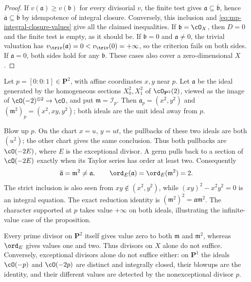 \begin{proof}
If $v(\mathfrak a)\geq v(\mathfrak b)$ for every divisorial $v$,
the finite test gives $\mathfrak a\subseteq\overline{\mathfrak b}$,
hence $\overline{\mathfrak a}\subseteq\overline{\mathfrak b}$ by
idempotence of integral closure. Conversely, this inclusion and
\eqref{eq:mp-integral-closure-values} give all the claimed
inequalities. If $\mathfrak b=\cO_X$, then $D=0$ and the finite
test is empty, as it should be. If $\mathfrak b=0$ and
$\mathfrak a\ne0$, the trivial valuation has
$v_{\triv}(\mathfrak a)=0<v_{\triv}(0)=+\infty$, so the criterion
fails on both sides. If $\mathfrak a=0$, both sides hold for any
$\mathfrak b$. These cases also cover a zero-dimensional $X$.
\end{proof}

\begin{example}\label{ex:mp-integral-closure-divisor-tests}
Let $p=[0:0:1]\in\mathbf P^2$, with affine coordinates $x,y$ near
$p$. Let $\mathfrak a$ be the ideal generated by the homogeneous
sections $X_0^2,X_1^2$ of $\cO_{\mathbf P^2}(2)$, viewed as the
image of $\cO(-2)^{\oplus2}\to\cO$, and put
$\mathfrak m=\mathcal I_p$. Then
$\mathfrak a_p=(x^2,y^2)$ and
$(\mathfrak m^2)_p=(x^2,xy,y^2)$; both ideals are the unit ideal
away from $p$.

Blow up $p$. On the chart $x=u$, $y=ut$, the pullbacks of these
two ideals are both $(u^2)$; the other chart gives the same
conclusion. Thus both pullbacks are $\cO(-2E)$, where $E$ is
the exceptional divisor. A germ pulls back to a section of
$\cO(-2E)$ exactly when its Taylor series has order at least two.
Consequently
\[
        \overline{\mathfrak a}=\mathfrak m^2\ne\mathfrak a,
        \qquad
        \ord_E(\mathfrak a)=\ord_E(\mathfrak m^2)=2.
\]
The strict inclusion is also seen from $xy\notin(x^2,y^2)$,
while $(xy)^2-x^2y^2=0$ is an integral equation.
The exact reduction identity is
$(\mathfrak m^2)^2=\mathfrak a\mathfrak m^2$.
The character supported at $p$ takes value $+\infty$ on both
ideals, illustrating the infinite-value case of the proposition.

Every prime divisor on $\mathbf P^2$ itself gives value zero to
both $\mathfrak m$ and $\mathfrak m^2$, whereas $\ord_E$ gives
values one and two. Thus divisors on $X$ alone do not suffice.
Conversely, exceptional divisors alone do not suffice either:
on $\mathbf P^1$ the ideals $\cO(-p)$ and $\cO(-2p)$ are distinct
and integrally closed, their blowups are the identity, and their
different values are detected by the nonexceptional divisor $p$.
\end{example}


